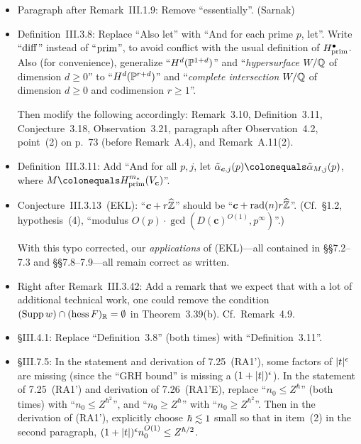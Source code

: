 \documentclass[12pt]{article}
\begin{document}
\begin{itemize}
    \item Paragraph after Remark~III.1.9:
    Remove ``essentially''.
    (Sarnak)
    
    \item Definition~III.3.8:
    Replace ``Also let'' with ``And for each prime $p$, let''.
    Write ``$\operatorname{diff}$'' instead of ``$\operatorname{prim}$'',
    to avoid conflict with the usual definition of $H^\bullet_{\operatorname{prim}}$.
    Also (for convenience), generalize ``$H^d(\mathbb{P}^{1+d})$'' and ``\emph{hypersurface} $W/\mathbb{Q}$ of dimension $d\geq 0$''
    to ``$H^d(\mathbb{P}^{r+d})$'' and ``\emph{complete intersection} $W/\mathbb{Q}$ of dimension $d\geq 0$ and codimension $r\geq 1$''.
    
    Then modify the following accordingly:
    Remark~3.10,
    Definition~3.11,
    Conjecture~3.18,
    Observation~3.21,
    paragraph after Observation~4.2,
    point~(2) on p.~73 (before Remark~A.4),
    and Remark~A.11(2).
    
    \item Definition~III.3.11:
    Add ``And for all $p,j$, let $\tilde{\alpha}_{\bm{c},j}(p)\defeq \tilde{\alpha}_{M,j}(p)$, where $M\defeq H^{m_\ast}_{\map{prim}}(V_{\bm{c}})$''.
    
    \item Conjecture~III.3.13~(EKL):
    ``$\bm{c}+r\widehat{\mathbb{Z}}$'' should be ``$\bm{c}+\operatorname{rad}(n)r\widehat{\mathbb{Z}}$''.
    (Cf.~\S1.2, hypothesis~(4), ``modulus $O(p)\cdot \gcd(D(\bm{c})^{O(1)}, p^\infty)$''.)
    
    With this typo corrected, our \emph{applications} of (EKL)---all contained in \S\S7.2--7.3 and \S\S7.8--7.9---all remain correct as written.
    
    \item Right after Remark~III.3.42:
    Add a remark that we expect that with a lot of additional technical work, one could remove the condition $(\operatorname{Supp}{w})\cap(\operatorname{hess}{F})_{\mathbb{R}}=\emptyset$ in Theorem~3.39(b).
    Cf.~Remark~4.9.
    
    \item \S{III.4.1}:
    Replace ``Definition~3.8'' (both times) with ``Definition~3.11''.
    
    \item \S{III.7.5}:
    In the statement and derivation of 7.25~(RA1'), some factors of $\lvert t \rvert^\epsilon$ are missing (since the ``GRH bound'' is missing a $(1+\lvert t \rvert)^\epsilon$).
    In the statement of 7.25~(RA1') and derivation of 7.26~(RA1'E),
    replace ``$n_0\leq Z^\hbar$'' (both times) with ``$n_0\leq Z^{\hbar^2}$'',
    and ``$n_0\geq Z^\hbar$'' with ``$n_0\geq Z^{\hbar^2}$''.
    Then in the derivation of (RA1'),
    explicitly choose $\hbar\lesssim 1$ small
    so that in item~(2) in the second paragraph, $(1+\lvert t \rvert)^\epsilon n_0^{O(1)}\leq Z^{\hbar/2}$.
    

\end{itemize}
\end{document}
